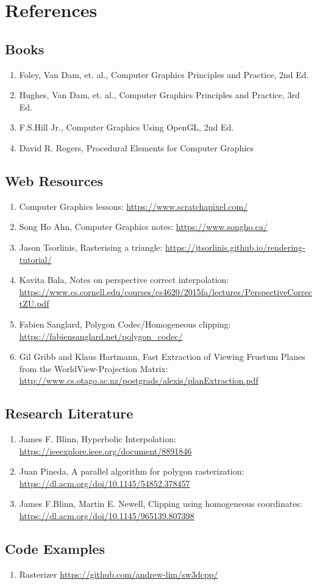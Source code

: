 \chapter{References}
\section{Books}
\begin{enumerate}
    \item Foley, Van Dam, et. al., Computer Graphics Principles and Practice, 2nd Ed. 
    \item Hughes, Van Dam, et. al., Computer Graphics Principles and Practice, 3rd Ed. 
    \item F.S.Hill Jr., Computer Graphics Using OpenGL, 2nd Ed.
    \item David R. Rogers, Procedural Elements for Computer Graphics
\end{enumerate}

\section{Web Resources}
\begin{enumerate}
    \item Computer Graphics lessons: \url{https://www.scratchapixel.com/}
    \item Song Ho Ahn, Computer Graphics notes:  \url{https://www.songho.ca/}
     \item Jason Tsorlinis, Rasterising a triangle: \url{https://jtsorlinis.github.io/rendering-tutorial/}
     \item Kavita Bala, Notes on perspective correct interpolation: \url{https://www.cs.cornell.edu/courses/cs4620/2015fa/lectures/PerspectiveCorrectZU.pdf}
     \item Fabien Sanglard, Polygon Codec/Homogeneous clipping:  \url{https://fabiensanglard.net/polygon_codec/}
	 \item Gil Gribb and Klaus Hartmann, Fast Extraction of Viewing Frustum Planes from the WorldView-Projection Matrix: \url{http://www.cs.otago.ac.nz/postgrads/alexis/planExtraction.pdf}
\end{enumerate}

\section{Research Literature}
\begin{enumerate}
    \item James F. Blinn, Hyperbolic Interpolation: \url{https://ieeexplore.ieee.org/document/8891846}
     \item Juan Pineda, A parallel algorithm for polygon rasterization: \url{https://dl.acm.org/doi/10.1145/54852.378457}
      \item James F.Blinn, Martin E. Newell,  Clipping using homogeneous coordinates: \url{https://dl.acm.org/doi/10.1145/965139.807398}
\end{enumerate}

\section{Code Examples}
\begin{enumerate}
    \item Rasterizer \url{https://github.com/andrew-lim/sw3dcpp/}
\end{enumerate}
\clearpage